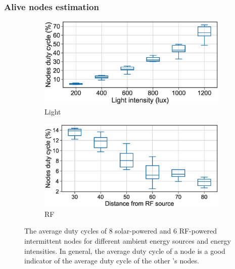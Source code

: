 \subsubsection{Alive nodes estimation}
\begin{figure}[t]
		\centering
		\begin{subfigure}{.49\columnwidth}
			\centering
			\includegraphics[width=\textwidth]{figures/cis_dutyCycle}
			\caption{Light}
		\end{subfigure}\hfill
		\begin{subfigure}{.49\columnwidth}
			\centering
			\includegraphics[width=\textwidth]{figures/rf_cis_dutyCycle}
			\caption{RF}
		\end{subfigure}\hfill
		\caption{The average duty cycles of 8 solar-powered and 6 RF-powered intermittent nodes for different ambient energy sources and energy intensities. In general, the average duty cycle of a node is a good indicator of the average duty cycle of the other \cis's nodes.}
		\label{fig:cis_nodes_dutyCycle}
\end{figure} 

